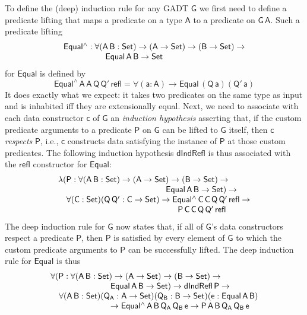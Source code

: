\documentclass[sigplan,10pt]{acmart}
\begin{document}
To define the (deep) induction rule for any GADT $\mathsf{G}$ we first
need to define a predicate lifting that maps a predicate on a type
$\mathsf{A}$ to a predicate on $\mathsf{G\,A}$. Such a predicate
lifting
\[\begin{array}{l}
\mathsf{Equal^{\wedge} : \forall (A\,B : Set) \to (A \to Set)
  \to (B \to Set) \to}\\
\mathsf{\hspace*{0.7in}Equal\,A\,B \to Set}
\end{array}\]
for $\mathsf{Equal}$ is defined by
\[\mathsf{Equal^{\wedge}\,A\,A\,Q\,Q'\,refl = \forall (a :
  A) \to Equal\,(Q\,a)(Q'\,a)}\]
It does exactly what we expect: it takes two predicates on the same
type as input and is inhabited iff they are extensionally equal.
Next, we need to associate with each data constructor $\mathsf{c}$ of
$\mathsf{G}$ an {\em induction hypothesis} asserting that, if the
custom predicate arguments to a predicate $\mathsf{P}$ on $\mathsf{G}$
can be lifted to $\mathsf{G}$ itself, then $\mathsf{c}$ {\em respects}
$\mathsf{P}$, i.e., $\mathsf{c}$ constructs data satisfying the
instance of $\mathsf{P}$ at those custom predicates. The following
induction hypothesis $\mathsf{dIndRefl}$ is thus associated with the
$\mathsf{refl}$ constructor for $\mathsf{Equal}$:
\begin{equation*}\label{eq:ind-refl}
\begin{array}{l}
\mathsf{\lambda (P : \forall (A\,B : Set) \to (A \to Set) \to (B \to
  Set) \to}\\
\mathsf{\hspace*{1.8in}Equal\,A\,B \to Set) \to} \\ 
\quad\mathsf{\forall (C : Set) (Q\, Q' : C \to Set) \to
  Equal^{\wedge}\,C\,C\,Q\,Q'\,refl \to}\\
\mathsf{\hspace*{2in}P\,C\,C\,Q\,Q'\,refl} 
\end{array}
\end{equation*}
The deep induction rule for $\mathsf{G}$ now states that, if all of
$\mathsf{G}$'s data constructors respect a predicate $\mathsf{P}$,
then $\mathsf{P}$ is satisfied by every element of $\mathsf{G}$ to
which the custom predicate arguments to $\mathsf{P}$ can be
successfully lifted.  The deep induction rule for $\mathsf{Equal}$ is
thus
\begin{equation}\label{eq:ind-equal}
\begin{array}{l}
\mathsf{\forall (P : \forall (A\,B : Set) \to (A \to Set) \to (B \to
  Set) \to}\\
\mathsf{\hspace*{1in}Equal\,A\,B \to Set) \to dIndRefl\,P \to}\\ \quad 
\mathsf{\forall (A\,B : Set) (Q_A : A \to Set) (Q_B : B \to Set)(e:
  Equal\,A\,B)}\\
\mathsf{\hspace*{1in}\to Equal^{\wedge}\,A\,B\,Q_A\,Q_B\,e \to
  P\,A\,B\,Q_A\,Q_B\,e}\\ 
\mathsf{\hspace*{2in} }
\end{array}
\end{equation}
\end{document}
